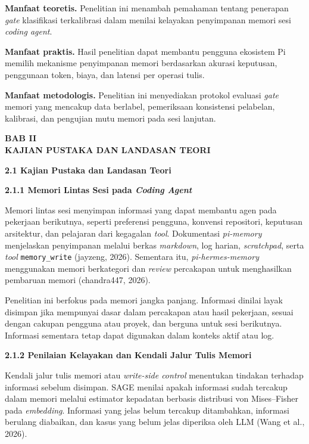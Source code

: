 \documentclass[12pt,a4paper]{article}
\newcommand{\asing}[1]{\textit{#1}}
\newcommand{\pim}{\textit{pi-memory}}
\newcommand{\phm}{\textit{pi-hermes-memory}}
\newcommand{\bab}[3]{%
  \clearpage\phantomsection\label{#3}%
  \begin{center}\large\bfseries BAB #1\\[0.2em] #2\end{center}\vspace{0.8em}}
\newcommand{\subbab}[2]{%
  \par\vspace{0.8em}\phantomsection\label{#2}%
  \noindent\textbf{#1}\par\nopagebreak\vspace{0.3em}}
\newcommand{\subsubbab}[2]{%
  \par\vspace{0.5em}\phantomsection\label{#2}%
  \noindent\textbf{#1}\par\nopagebreak\vspace{0.2em}}
\begin{document}
\textbf{Manfaat teoretis.} Penelitian ini menambah pemahaman tentang penerapan \asing{gate} klasifikasi terkalibrasi dalam menilai kelayakan penyimpanan memori sesi \asing{coding agent}.

\textbf{Manfaat praktis.} Hasil penelitian dapat membantu pengguna ekosistem Pi memilih mekanisme penyimpanan memori berdasarkan akurasi keputusan, penggunaan token, biaya, dan latensi per operasi tulis.

\textbf{Manfaat metodologis.} Penelitian ini menyediakan protokol evaluasi \asing{gate} memori yang mencakup data berlabel, pemeriksaan konsistensi pelabelan, kalibrasi, dan pengujian mutu memori pada sesi lanjutan.

\bab{II}{KAJIAN PUSTAKA DAN LANDASAN TEORI}{sec:bab2}

\subbab{2.1 Kajian Pustaka dan Landasan Teori}{sec:2.1}

\subsubbab{2.1.1 Memori Lintas Sesi pada \asing{Coding Agent}}{sec:2.1.1}

Memori lintas sesi menyimpan informasi yang dapat membantu agen pada pekerjaan berikutnya, seperti preferensi pengguna, konvensi repositori, keputusan arsitektur, dan pelajaran dari kegagalan \asing{tool}. Dokumentasi \pim{} menjelaskan penyimpanan melalui berkas \asing{markdown}, log harian, \asing{scratchpad}, serta \asing{tool} \texttt{memory\_write} (jayzeng, 2026). Sementara itu, \phm{} menggunakan memori berkategori dan \asing{review} percakapan untuk menghasilkan pembaruan memori (chandra447, 2026).

Penelitian ini berfokus pada memori jangka panjang. Informasi dinilai layak disimpan jika mempunyai dasar dalam percakapan atau hasil pekerjaan, sesuai dengan cakupan pengguna atau proyek, dan berguna untuk sesi berikutnya. Informasi sementara tetap dapat digunakan dalam konteks aktif atau log.

\subsubbab{2.1.2 Penilaian Kelayakan dan Kendali Jalur Tulis Memori}{sec:2.1.2}

Kendali jalur tulis memori atau \asing{write-side control} menentukan tindakan terhadap informasi sebelum disimpan. SAGE menilai apakah informasi sudah tercakup dalam memori melalui estimator kepadatan berbasis distribusi von Mises--Fisher pada \asing{embedding}. Informasi yang jelas belum tercakup ditambahkan, informasi berulang diabaikan, dan kasus yang belum jelas diperiksa oleh LLM (Wang et al., 2026).
\end{document}
